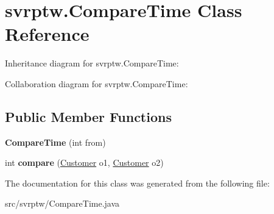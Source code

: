 \hypertarget{classsvrptw_1_1_compare_time}{}\section{svrptw.\+Compare\+Time Class Reference}
\label{classsvrptw_1_1_compare_time}


Inheritance diagram for svrptw.\+Compare\+Time\+:


Collaboration diagram for svrptw.\+Compare\+Time\+:
\subsection*{Public Member Functions}
\begin{DoxyCompactItemize}
\item 
{\bfseries Compare\+Time} (int from)\hypertarget{classsvrptw_1_1_compare_time_afb8bf6f4dbd367df38267f9c426eed44}{}\label{classsvrptw_1_1_compare_time_afb8bf6f4dbd367df38267f9c426eed44}

\item 
int {\bfseries compare} (\hyperlink{classsvrptw_1_1_customer}{Customer} o1, \hyperlink{classsvrptw_1_1_customer}{Customer} o2)\hypertarget{classsvrptw_1_1_compare_time_a9d405c710f5fd4ee45698d54cfaf092a}{}\label{classsvrptw_1_1_compare_time_a9d405c710f5fd4ee45698d54cfaf092a}

\end{DoxyCompactItemize}


The documentation for this class was generated from the following file\+:\begin{DoxyCompactItemize}
\item 
src/svrptw/Compare\+Time.\+java\end{DoxyCompactItemize}
